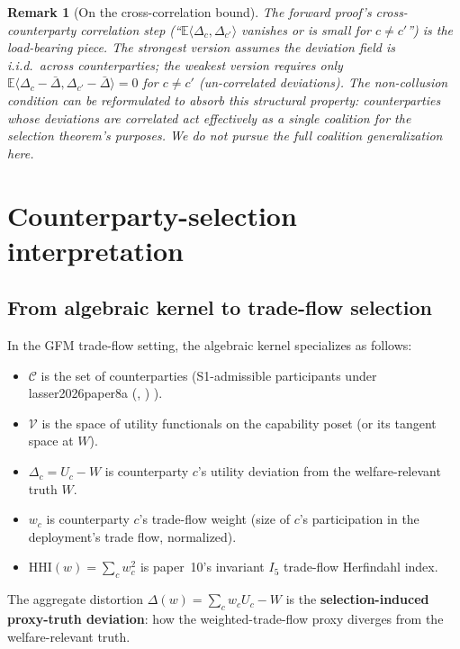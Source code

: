 \documentclass{article}
\makeatletter
\newcommand{\citep}[2][]{%
  \begingroup
  \def\@tmpkey{#2}%
  \ifx\@tmpkey\@empty\else
    (\ifx\@empty#1\@empty\else #1, \fi
     \@nameuse{bibkey@\@tmpkey})%
  \fi
  \endgroup
}
\newtheorem{remark}{Remark}
\newcommand{\HHI}{\mathrm{HHI}}
\makeatother
\begin{document}
\begin{remark}[On the cross-correlation bound]
\label{rem:cross-corr}
The forward proof's cross-counterparty correlation step
(``$\mathbb{E}\langle \Delta_c, \Delta_{c'}\rangle$ vanishes or is
small for $c \neq c'$'') is the load-bearing piece.  The
strongest version assumes the deviation field is i.i.d.\ across
counterparties; the weakest version requires only
$\mathbb{E}\langle \Delta_c - \bar\Delta, \Delta_{c'} - \bar\Delta\rangle = 0$
for $c \neq c'$ (un-correlated deviations).  The
\emph{non-collusion} condition can be reformulated to absorb this
structural property: counterparties whose deviations are
correlated act effectively as a single coalition for the
selection theorem's purposes.  We do not pursue the full coalition
generalization here.
\end{remark}

\section{Counterparty-selection interpretation}
\label{sec:counterparty}

\subsection{From algebraic kernel to trade-flow selection}

In the GFM trade-flow setting, the algebraic kernel specializes
as follows:
\begin{itemize}
\item $\mathcal{C}$ is the set of counterparties (S1-admissible
  participants under~\citep{lasser2026paper8a}).
\item $\mathcal{V}$ is the space of utility functionals on the
  capability poset (or its tangent space at $W$).
\item $\Delta_c = U_c - W$ is counterparty $c$'s utility deviation
  from the welfare-relevant truth $W$.
\item $w_c$ is counterparty $c$'s trade-flow weight (size of $c$'s
  participation in the deployment's trade flow, normalized).
\item $\HHI(w) = \sum_c w_c^2$ is paper~10's invariant $I_5$
  trade-flow Herfindahl index.
\end{itemize}

The aggregate distortion $\Delta(w) = \sum_c w_c U_c - W$ is the
\textbf{selection-induced proxy-truth deviation}: how the
weighted-trade-flow proxy diverges from the welfare-relevant
truth.
\end{document}
